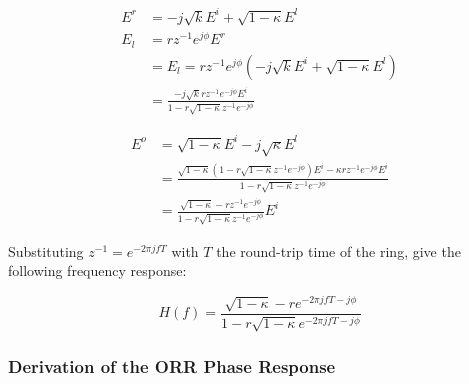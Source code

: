 \begin{equation}
	\begin{aligned}
	E^r&=-j\sqrt{k}E^i+\sqrt{1-\kappa}E^l\\
	E_l&=rz^{-1}e^{j\phi}E^r \\
	&=E_l=rz^{-1}e^{j\phi}(-j\sqrt{k}E^i+\sqrt{1-\kappa}E^l)\\
	&=\frac{-j\sqrt{k}rz^{-1}e^{-j\phi}E^i}{1-r\sqrt{1-\kappa}z^{-1}e^{-j\phi}}
	\end{aligned}
\end{equation}

\begin{equation}
	\begin{aligned}
	E^o&=\sqrt{1-\kappa}E^i-j\sqrt{\kappa}E^l \\
	&=\frac{\sqrt{1-\kappa}(1-r\sqrt{1-\kappa}z^{-1}e^{-j\phi})E^i-\kappa rz^{-1}e^{-j\phi}E^i}{1-r\sqrt{1-\kappa}z^{-1}e^{-j\phi}}\\
	&=\frac{\sqrt{1-\kappa}-rz^{-1}e^{-j\phi}}{1-r\sqrt{1-\kappa}z^{-1}e^{-j\phi}}E^i
	\end{aligned}
\end{equation}

Substituting $z^{-1}=e^{-2\pi jfT}$ with $T$ the round-trip time of the ring, give the following frequency response:

\begin{equation}
	H(f)=\frac{\sqrt{1-\kappa}-re^{-2\pi jfT-j\phi}}{1-r\sqrt{1-\kappa}e^{-2\pi jfT-j\phi}}
\end{equation}

\subsubsection{Derivation of the ORR Phase Response}



